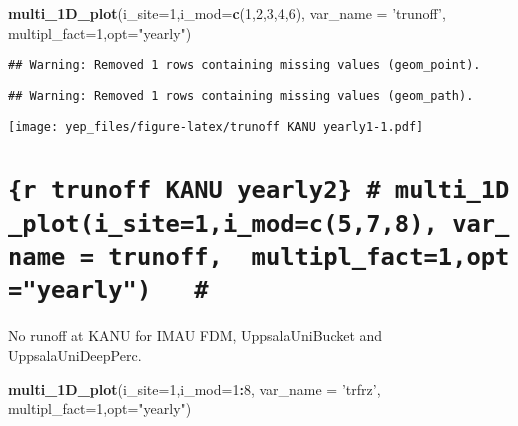 \documentclass[]{article}
\newenvironment{Shaded}{\begin{snugshade}}{\end{snugshade}}
\newcommand{\DataTypeTok}[1]{\textcolor[rgb]{0.13,0.29,0.53}{#1}}
\newcommand{\DecValTok}[1]{\textcolor[rgb]{0.00,0.00,0.81}{#1}}
\newcommand{\KeywordTok}[1]{\textcolor[rgb]{0.13,0.29,0.53}{\textbf{#1}}}
\newcommand{\NormalTok}[1]{#1}
\newcommand{\OperatorTok}[1]{\textcolor[rgb]{0.81,0.36,0.00}{\textbf{#1}}}
\newcommand{\StringTok}[1]{\textcolor[rgb]{0.31,0.60,0.02}{#1}}
\begin{document}
\begin{Shaded}
\begin{Highlighting}[]
\KeywordTok{multi_1D_plot}\NormalTok{(}\DataTypeTok{i_site=}\DecValTok{1}\NormalTok{,}\DataTypeTok{i_mod=}\KeywordTok{c}\NormalTok{(}\DecValTok{1}\NormalTok{,}\DecValTok{2}\NormalTok{,}\DecValTok{3}\NormalTok{,}\DecValTok{4}\NormalTok{,}\DecValTok{6}\NormalTok{), }\DataTypeTok{var_name =} \StringTok{'trunoff'}\NormalTok{,  }\DataTypeTok{multipl_fact=}\DecValTok{1}\NormalTok{,}\DataTypeTok{opt=}\StringTok{"yearly"}\NormalTok{)  }
\end{Highlighting}
\end{Shaded}

\begin{verbatim}
## Warning: Removed 1 rows containing missing values (geom_point).
\end{verbatim}

\begin{verbatim}
## Warning: Removed 1 rows containing missing values (geom_path).
\end{verbatim}

\texttt{[image: yep\_files/figure-latex/trunoff KANU yearly1-1.pdf]}

\hypertarget{r-trunoff-kanu-yearly2-multi_1d_ploti_site1i_modc578-var_name-trunoff-multipl_fact1optyearly}{%
\section{\texorpdfstring{\texttt{\{r\ trunoff\ KANU\ yearly2\}\ \#\ multi\_1D\_plot(i\_site=1,i\_mod=c(5,7,8),\ var\_name\ =\ \textquotesingle{}trunoff\textquotesingle{},\ \ multipl\_fact=1,opt="yearly")\ \ \ \#}}{\{r trunoff KANU yearly2\} \# multi\_1D\_plot(i\_site=1,i\_mod=c(5,7,8), var\_name = 'trunoff',  multipl\_fact=1,opt="yearly")   \#}}\label{r-trunoff-kanu-yearly2-multi_1d_ploti_site1i_modc578-var_name-trunoff-multipl_fact1optyearly}}

No runoff at KANU for IMAU FDM, UppsalaUniBucket and UppsalaUniDeepPerc.

\begin{Shaded}
\begin{Highlighting}[]
\KeywordTok{multi_1D_plot}\NormalTok{(}\DataTypeTok{i_site=}\DecValTok{1}\NormalTok{,}\DataTypeTok{i_mod=}\DecValTok{1}\OperatorTok{:}\DecValTok{8}\NormalTok{, }\DataTypeTok{var_name =} \StringTok{'trfrz'}\NormalTok{,  }\DataTypeTok{multipl_fact=}\DecValTok{1}\NormalTok{,}\DataTypeTok{opt=}\StringTok{"yearly"}\NormalTok{)  }
\end{Highlighting}
\end{Shaded}
\end{document}
